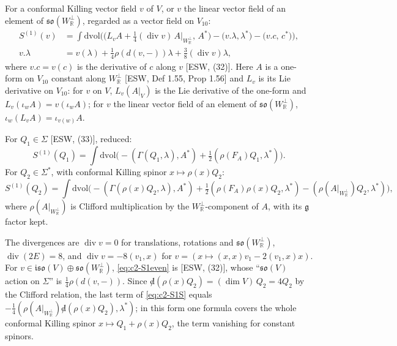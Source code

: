 \begin{definition}
\label{def:c2-S1}
For a conformal Killing vector field $v$ of $V$, or $v$ the linear vector field of an element of $\mathfrak{so}(W_{\mathbb R}^\perp)$, regarded as a vector field on $V_{10}$:
\begin{equation}
\begin{aligned}
S^{(1)}(v)&=\int\mathrm{dvol}\Big(\big(L_vA+\tfrac14(\operatorname{div}v)\,A|_{W_{\mathbb R}^\perp},\,A^*\big)-\big(v.\lambda,\lambda^*\big)-\big(v.c,\,c^*\big)\Big),\\
v.\lambda&=v(\lambda)+\tfrac14\rho(d(v,-))\lambda+\tfrac38(\operatorname{div}v)\lambda ,
\end{aligned}
\label{eq:c2-S1even}
\end{equation}
where $v.c=v(c)$ is the derivative of $c$ along $v$ [ESW, (32)]. Here $A$ is a one-form on $V_{10}$ constant along $W_{\mathbb R}^\perp$ [ESW, Def 1.55, Prop 1.56] and $L_v$ is its Lie derivative on $V_{10}$: for $v$ on $V$, $L_v(A|_V)$ is the Lie derivative of the one-form and $L_v(\iota_wA)=v(\iota_wA)$; for $v$ the linear vector field of an element of $\mathfrak{so}(W_{\mathbb R}^\perp)$, $\iota_w(L_vA)=\iota_{v(w)}A$.

For $Q_1\in\Sigma$ [ESW, (33)], reduced:
\begin{equation}
S^{(1)}(Q_1)=\int\mathrm{dvol}\Big(-(\Gamma(Q_1,\lambda),A^*)+\tfrac12(\rho(F_A)Q_1,\lambda^*)\Big).
\label{eq:c2-S1Q}
\end{equation}
For $Q_2\in\Sigma^*$, with conformal Killing spinor $x\mapsto\rho(x)Q_2$:
\begin{equation}
S^{(1)}(Q_2)=\int\mathrm{dvol}\Big(-(\Gamma(\rho(x)Q_2,\lambda),A^*)+\tfrac12(\rho(F_A)\rho(x)Q_2,\lambda^*)-(\rho(A|_{W_{\mathbb R}^\perp})Q_2,\lambda^*)\Big),
\label{eq:c2-S1S}
\end{equation}
where $\rho(A|_{W_{\mathbb R}^\perp})$ is Clifford multiplication by the $W_{\mathbb R}^\perp$-component of $A$, with its $\mathfrak g$ factor kept.
\end{definition}

The divergences are $\operatorname{div}v=0$ for translations, rotations and $\mathfrak{so}(W_{\mathbb R}^\perp)$, $\operatorname{div}(2E)=8$, and $\operatorname{div}v=-8(v_1,x)$ for $v=(x\mapsto(x,x)v_1-2(v_1,x)x)$. For $v\in\mathfrak{iso}(V)\oplus\mathfrak{so}(W_{\mathbb R}^\perp)$, \eqref{eq:c2-S1even} is [ESW, (32)], whose ``$\mathfrak{so}(V)$ action on $\Sigma$'' is $\tfrac14\rho(d(v,-))$. Since ${\not d}(\rho(x)Q_2)=(\dim V)\,Q_2=4Q_2$ by the Clifford relation, the last term of \eqref{eq:c2-S1S} equals $-\tfrac14(\rho(A|_{W_{\mathbb R}^\perp}){\not d}(\rho(x)Q_2),\lambda^*)$; in this form one formula covers the whole conformal Killing spinor $x\mapsto Q_1+\rho(x)Q_2$, the term vanishing for constant spinors.

